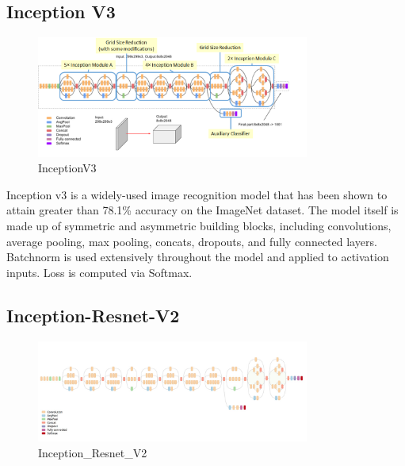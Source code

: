 \documentclass[11pt]{article}
\begin{document}
    \subsection{Inception V3 \cite{szegedy2016rethinking}}
    \begin{figure}[ht]
    	\centering
    	\includegraphics[width=0.8\textwidth]{inceptionv3_arch}
    	\caption{InceptionV3}
    \end{figure}
Inception v3 is a widely-used image recognition model that has been shown to attain greater than 78.1\% accuracy on the ImageNet dataset. The model itself is made up of symmetric and asymmetric building blocks, including convolutions, average pooling, max pooling, concats, dropouts, and fully connected layers. Batchnorm is used extensively throughout the model and applied to activation inputs. Loss is computed via Softmax. 
\newpage

	\subsection{Inception-Resnet-V2 \cite{szegedy2017inception}}
	\begin{figure}[ht]
		\centering
		\includegraphics[width=0.8\textwidth]{inceptionresnet_arch}
		\caption{Inception\_Resnet\_V2}
	\end{figure}
	
\end{document}
